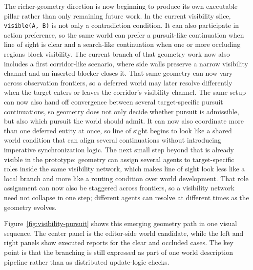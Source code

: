 \documentclass[sigplan,review,anonymous]{acmart}
\begin{document}
The richer-geometry direction is now beginning to produce its own executable pillar rather than only remaining future work.
In the current visibility slice, \texttt{visible(A, B)} is not only a contradiction condition.
It can also participate in action preference, so the same world can prefer a pursuit-like continuation when line of sight is clear and a search-like continuation when one or more occluding regions block visibility.
The current branch of that geometry work now also includes a first corridor-like scenario, where side walls preserve a narrow visibility channel and an inserted blocker closes it.
That same geometry can now vary across observation frontiers, so a deferred world may later resolve differently when the target enters or leaves the corridor's visibility channel.
The same setup can now also hand off convergence between several target-specific pursuit continuations, so geometry does not only decide whether pursuit is admissible, but also which pursuit the world should admit.
It can now also coordinate more than one deferred entity at once, so line of sight begins to look like a shared world condition that can align several continuations without introducing imperative synchronization logic.
The next small step beyond that is already visible in the prototype: geometry can assign several agents to target-specific roles inside the same visibility network, which makes line of sight look less like a local branch and more like a routing condition over world development.
That role assignment can now also be staggered across frontiers, so a visibility network need not collapse in one step; different agents can resolve at different times as the geometry evolves.

Figure~\ref{fig:visibility-pursuit} shows this emerging geometry path in one visual sequence.
The center panel is the editor-side world candidate, while the left and right panels show executed reports for the clear and occluded cases.
The key point is that the branching is still expressed as part of one world description pipeline rather than as distributed update-logic checks.
\end{document}
